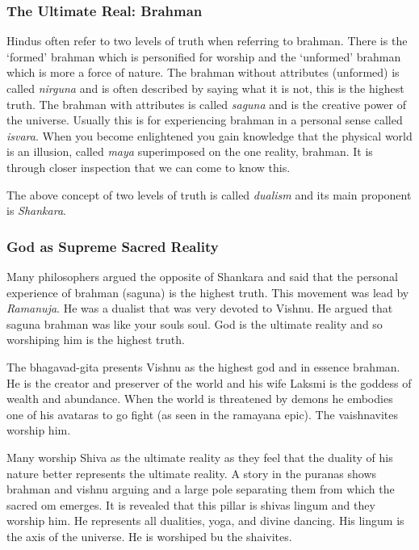 \documentclass{article}
\begin{document}
\subsubsection{The Ultimate Real: Brahman}
\label{sub:the_ultimate_real_brahman}
Hindus often refer to two levels of truth when referring to brahman. There is the `formed' brahman which is personified for worship and the `unformed' brahman which is more a force of nature. The brahman without attributes (unformed) is called \emph{nirguna} and is often described by saying what it is not, this is the highest truth. The brahman with attributes is called \emph{saguna} and is the creative power of the universe. Usually this is for experiencing brahman in a personal sense called \emph{isvara}. When you become enlightened you gain knowledge that the physical world is an illusion, called \emph{maya} superimposed on the one reality, brahman. It is through closer inspection that we can come to know this.

The above concept of two levels of truth is called \emph{dualism} and its main proponent is \emph{Shankara}.

\subsubsection{God as Supreme Sacred Reality}
\label{sub:god_as_supreme_sacred_reality}
Many philosophers argued the opposite of Shankara and said that the personal experience of brahman (saguna) is the highest truth. This movement was lead by \emph{Ramanuja}. He was a dualist that was very devoted to Vishnu. He argued that saguna brahman was like your souls soul. God is the ultimate reality and so worshiping him is the highest truth.

The bhagavad-gita presents Vishnu as the highest god and in essence brahman. He is the creator and preserver of the world and his wife Laksmi is the goddess of wealth and abundance. When the world is threatened by demons he embodies one of his avataras to go fight (as seen in the ramayana epic). The vaishnavites worship him.

Many worship Shiva as the ultimate reality as they feel that the duality of his nature better represents the ultimate reality. A story in the puranas shows brahman and vishnu arguing and a large pole separating them from which the sacred om emerges. It is revealed that this pillar is shivas lingum and they worship him. He represents all dualities, yoga, and divine dancing. His lingum is the axis of the universe. He is worshiped bu the shaivites.
\end{document}

